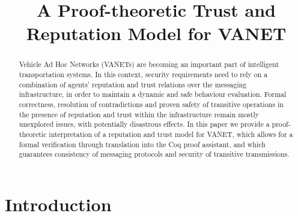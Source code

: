 \documentclass[compsoc, conference, letterpaper, 10pt, times]{IEEEtran}
\begin{document}
\title{A Proof-theoretic Trust and Reputation Model for VANET}


\author{
	}


\maketitle

\begin{abstract}
Vehicle Ad Hoc Networks (VANETs) are becoming an important part of intelligent transportation systems. In this context, security requirements need to rely on a combination of agents' reputation and trust relations over the messaging infrastructure, in order to maintain a dynamic and safe behaviour evaluation. Formal correctness, resolution of contradictions and proven safety of transitive operations in the presence of reputation and trust within the infrastructure remain mostly unexplored issues, with potentially disastrous effects. In this paper we provide a proof-theoretic  interpretation of a reputation and trust model for VANET, which allows for a formal verification through translation into the Coq proof assistant, and which guarantees consistency of messaging protocols and security of transitive transmissions.
\end{abstract}


\section{Introduction}\label{sec:intro}
\end{document}
